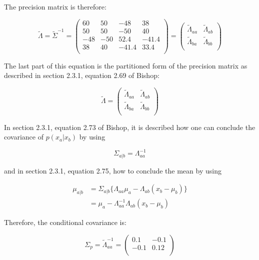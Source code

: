 \documentclass[a4paper]{article}
\begin{document}
\vspace{1em}

The precision matrix is therefore: 

\[ \tilde{\Lambda} = \tilde{\Sigma}^{-1} = 
	\left(
	\begin{array}{cc|cc}
	60 & 50 & -48 & 38 \\
	50 & 50 & -50 & 40 \\
	\hline
	-48 & -50 & 52.4 & -41.4 \\
	38 & 40 & -41.4 & 33.4 \\	
	\end{array}
	\right) = \left(
	\begin{array}{c|c}
	\tilde{\Lambda}_{aa} & \tilde{\Lambda}_{ab} \\
	\hline
	\tilde{\Lambda}_{ba} & \tilde{\Lambda}_{bb} \\	
	\end{array}
	\right)
\]	

\vspace{1em}

The last part of this equation is the partitioned form of the precision matrix as described in section 2.3.1, equation 2.69 of Bishop:

\[ \tilde{\Lambda} = 
	\left(
	\begin{array}{c|c}
	\tilde{\Lambda}_{aa} & \tilde{\Lambda}_{ab} \\
	\hline
	\tilde{\Lambda}_{ba} & \tilde{\Lambda}_{bb} \\	
	\end{array}
	\right)
\]	


In section 2.3.1, equation 2.73 of Bishop, it is described how one can conclude the covariance of $p(x_a|x_b)$ by using

\begin{equation*}
	\Sigma_{a|b} = \Lambda^{-1}_{aa}
\end{equation*}

and in section 2.3.1, equation 2.75, how to conclude the mean by using

\begin{align*}
 	\mu_{a|b} &= \Sigma_{a|b} \{ \Lambda_{aa} \mu_a - \Lambda_{ab}(x_b - \mu_b)\}\\
 	&= \mu_a - \Lambda^{-1}_{aa} \Lambda_{ab} (x_b - \mu_b)
\end{align*}

Therefore, the conditional covariance is:


\[ \Sigma_p = \tilde{\Lambda}^{-1}_{aa} = 
	\left(
	\begin{array}{cc}
	0.1 & -0.1 \\
	-0.1 & 0.12 \\	
	\end{array}
	\right)
\]	
\end{document}
